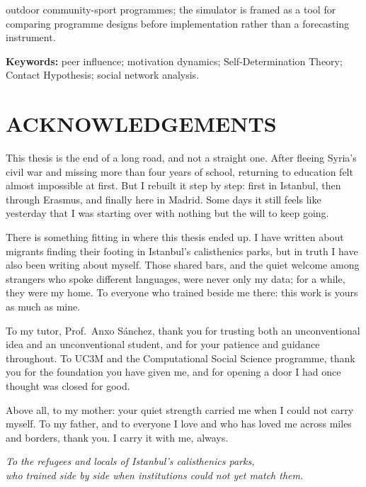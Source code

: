 outdoor community-sport programmes; the simulator is framed as a tool for comparing programme designs before implementation rather than a forecasting instrument.

  \textbf{Keywords:} peer influence; motivation dynamics; Self-Determination Theory; Contact Hypothesis; social network analysis.

\newpage\thispagestyle{empty}\mbox{}

\clearpage
\thispagestyle{plain}
\chapter*{\uppercase{Acknowledgements}}

This thesis is the end of a long road, and not a straight one. After fleeing Syria's civil war and missing more than four years of school, returning to education felt almost impossible at first. But I rebuilt it step by step: first in Istanbul, then through Erasmus, and finally here in Madrid. Some days it still feels like yesterday that I was starting over with nothing but the will to keep going.

There is something fitting in where this thesis ended up. I have written about migrants finding their footing in Istanbul's calisthenics parks, but in truth I have also been writing about myself. Those shared bars, and the quiet welcome among strangers who spoke different languages, were never only my data; for a while, they were my home. To everyone who trained beside me there: this work is yours as much as mine.

To my tutor, Prof.\ Anxo S\'{a}nchez, thank you for trusting both an unconventional idea and an unconventional student, and for your patience and guidance throughout. To UC3M and the Computational Social Science programme, thank you for the foundation you have given me, and for opening a door I had once thought was closed for good.

Above all, to my mother: your quiet strength carried me when I could not carry myself. To my father, and to everyone I love and who has loved me across miles and borders, thank you. I carry it with me, always.

\newpage\thispagestyle{empty}\mbox{}

\clearpage
\thispagestyle{plain}
\vspace*{6cm}
\begin{center}
  \itshape
  To the refugees and locals of Istanbul's calisthenics parks,\\
  who trained side by side when institutions could not yet match them.
\end{center}
\vfill

